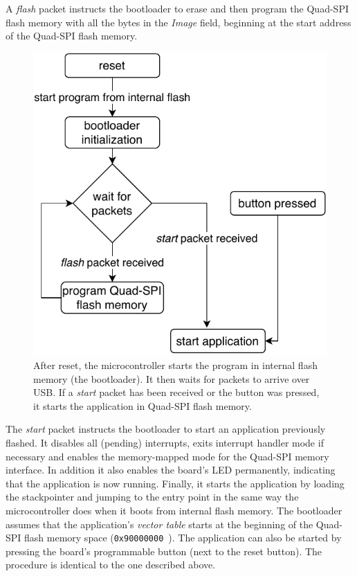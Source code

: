 A \textit{flash} packet instructs the bootloader to erase and then program the Quad-SPI flash memory
with all the bytes in the \textit{Image} field, beginning at the start address of the Quad-SPI flash
memory.

\begin{figure}[h]
    \centering
    \includegraphics[scale=1.0]{img/bootloader_flowchart.pdf}
    \caption[Bootloader program flow]{
        After reset, the microcontroller starts the program in internal flash memory (the bootloader).
        It then waits for packets to arrive over USB. If a \textit{start} packet has been received or
        the button was pressed, it starts the application in Quad-SPI flash memory.
    }
\end{figure}

The \textit{start} packet instructs the bootloader to start an application previously flashed. It
disables all (pending) interrupts, exits interrupt handler mode if necessary and enables the
memory-mapped mode for the Quad-SPI memory interface. In addition it also enables the board's LED
permanently, indicating that the application is now running. Finally, it starts the application by
loading the stackpointer and jumping to the entry point in the same way the microcontroller does
when it boots from internal flash memory. The bootloader assumes that the application's \textit{vector table}
starts at the beginning of the Quad-SPI flash memory space (\lstinline{0x90000000}~\cite{mcu-ref-manual}).
The application can also be started by pressing the board's programmable button (next to the reset
button). The procedure is identical to the one described above.

